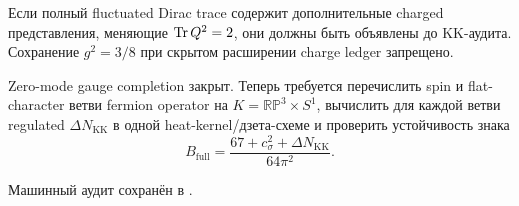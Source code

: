 \begin{nogocriterion}
Если полный fluctuated Dirac trace содержит дополнительные charged
представления, меняющие \(\operatorname{Tr} Q^2=2\), они должны быть объявлены до
KK-аудита. Сохранение \(g^2=3/8\) при скрытом расширении charge ledger
запрещено.
\end{nogocriterion}

\begin{protocol}
Zero-mode gauge completion закрыт. Теперь требуется перечислить spin и
flat-character ветви fermion operator на
\(K=\mathbb{RP}^3\times S^1\), вычислить для каждой ветви regulated
\(\Delta N_{\mathrm{KK}}\) в одной heat-kernel/дзета-схеме и проверить
устойчивость знака
\begin{equation}
 B_{\mathrm{full}}
 =\frac{67+c_\sigma^2+\Delta N_{\mathrm{KK}}}{64\pi^2}.
\end{equation}
\end{protocol}

Машинный аудит сохранён в
.